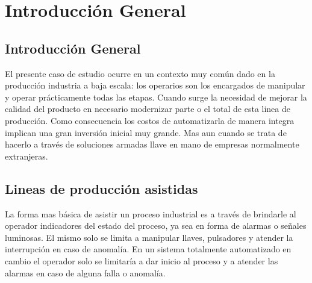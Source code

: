 
\chapter{Introducción General} %

\label{Chapter1} %
\label{IntroGeneral}


\newcommand{\keyword}[1]{\textbf{#1}}
\newcommand{\tabhead}[1]{\textbf{#1}}
\newcommand{\code}[1]{\texttt{#1}}
\newcommand{\file}[1]{\texttt{\bfseries#1}}
\newcommand{\option}[1]{\texttt{\itshape#1}}
\newcommand{\grados}{$^{\circ}$}


\section{ Introducción General }

El presente caso de estudio ocurre en un contexto muy común dado en la producción industria a baja escala: los operarios son los encargados de manipular y operar prácticamente todas las etapas. Cuando surge la necesidad de mejorar la calidad del producto en necesario modernizar parte o el total de esta linea de producción. Como consecuencia los costos de automatizarla de manera integra implican una gran inversión inicial muy grande. Mas aun cuando se trata de hacerlo a través de soluciones armadas llave en mano de empresas normalmente extranjeras.

\section{ Lineas de producción asistidas }

La forma mas básica de asistir un proceso industrial es a través de brindarle al operador indicadores del estado del proceso, ya sea en forma de alarmas o señales luminosas. El mismo solo se limita a manipular llaves, pulsadores y atender la interrupción en caso de anomalía. 
En un sistema totalmente automatizado en cambio el operador solo se limitaría a dar inicio al proceso y a atender las alarmas en caso de alguna falla o anomalía.

